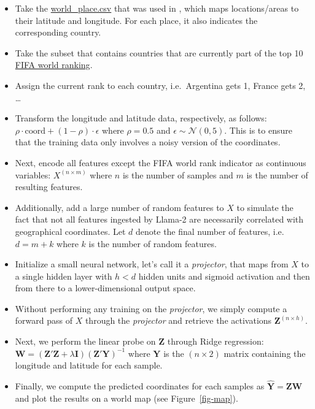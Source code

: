 \documentclass{article}
\theoremstyle{plain}
\theoremstyle{definition}
\theoremstyle{remark}
\begin{document}
\begin{itemize}
\tightlist
\item
  Take the
  \href{https://github.com/wesg52/world-models/blob/main/data/entity_datasets/world_place.csv}{world\_place.csv}
  that was used in \cite{gurnee2023language}, which maps locations/areas
  to their latitude and longitude. For each place, it also indicates the
  corresponding country.
\item
  Take the subset that contains countries that are currently part of the
  top 10
  \href{https://www.fifa.com/fifa-world-ranking/men?dateId=id14142}{FIFA
  world ranking}.
\item
  Assign the current rank to each country, i.e.~Argentina gets 1, France
  gets 2, \ldots{}
\item
  Transform the longitude and latitude data, respectively, as follows:
  \(\rho \cdot \text{coord} + (1-\rho) \cdot \epsilon\) where
  \(\rho=0.5\) and \(\epsilon \sim \mathcal{N}(0, 5)\). This is to
  ensure that the training data only involves a noisy version of the
  coordinates.
\item
  Next, encode all features except the FIFA world rank indicator as
  continuous variables: \(X^{(n \times m)}\) where \(n\) is the number
  of samples and \(m\) is the number of resulting features.
\item
  Additionally, add a large number of random features to \(X\) to
  simulate the fact that not all features ingested by Llama-2 are
  necessarily correlated with geographical coordinates. Let \(d\) denote
  the final number of features, i.e.~\(d=m+k\) where \(k\) is the number
  of random features.
\item
  Initialize a small neural network, let's call it a \emph{projector},
  that maps from \(X\) to a single hidden layer with \(h<d\) hidden
  units and sigmoid activation and then from there to a
  lower-dimensional output space.
\item
  Without performing any training on the \emph{projector}, we simply
  compute a forward pass of \(X\) through the \emph{projector} and
  retrieve the activations \(\mathbf{Z}^{(n\times h)}\).
\item
  Next, we perform the linear probe on \(\mathbf{Z}\) through Ridge
  regression:
  \(\mathbf{W} = (\mathbf{Z}'\mathbf{Z} + \lambda \mathbf{I}) (\mathbf{Z}'\mathbf{Y})^{-1}\)
  where \(\mathbf{Y}\) is the \((n \times 2)\) matrix containing the
  longitude and latitude for each sample.
\item
  Finally, we compute the predicted coordinates for each samples as
  \(\widehat{\mathbf{Y}}=\mathbf{Z}\mathbf{W}\) and plot the results on
  a world map (see Figure~\ref{fig-map}).
\end{itemize}
\end{document}

